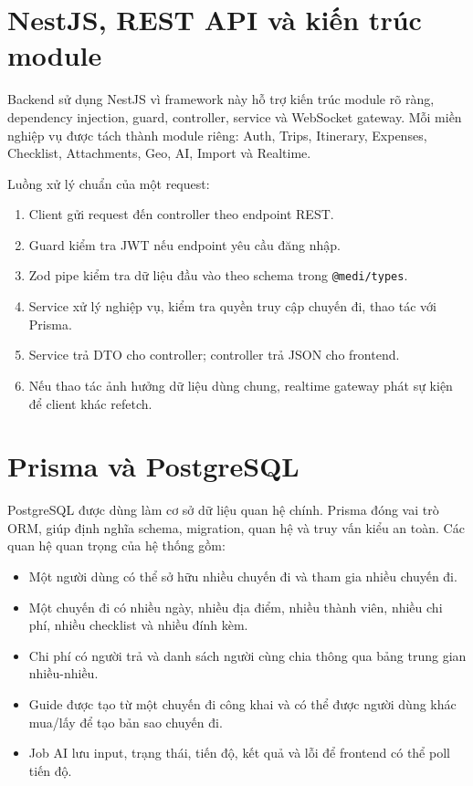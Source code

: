 \documentclass[a4paper]{report}
\begin{document}
\section{NestJS, REST API và kiến trúc module}

Backend sử dụng NestJS vì framework này hỗ trợ kiến trúc module rõ ràng, dependency injection, guard, controller, service và WebSocket gateway. Mỗi miền nghiệp vụ được tách thành module riêng: Auth, Trips, Itinerary, Expenses, Checklist, Attachments, Geo, AI, Import và Realtime.

Luồng xử lý chuẩn của một request:

\begin{enumerate}
  \item Client gửi request đến controller theo endpoint REST.
  \item Guard kiểm tra JWT nếu endpoint yêu cầu đăng nhập.
  \item Zod pipe kiểm tra dữ liệu đầu vào theo schema trong \texttt{@medi/types}.
  \item Service xử lý nghiệp vụ, kiểm tra quyền truy cập chuyến đi, thao tác với Prisma.
  \item Service trả DTO cho controller; controller trả JSON cho frontend.
  \item Nếu thao tác ảnh hưởng dữ liệu dùng chung, realtime gateway phát sự kiện để client khác refetch.
\end{enumerate}

\section{Prisma và PostgreSQL}

PostgreSQL được dùng làm cơ sở dữ liệu quan hệ chính. Prisma đóng vai trò ORM, giúp định nghĩa schema, migration, quan hệ và truy vấn kiểu an toàn. Các quan hệ quan trọng của hệ thống gồm:

\begin{itemize}
  \item Một người dùng có thể sở hữu nhiều chuyến đi và tham gia nhiều chuyến đi.
  \item Một chuyến đi có nhiều ngày, nhiều địa điểm, nhiều thành viên, nhiều chi phí, nhiều checklist và nhiều đính kèm.
  \item Chi phí có người trả và danh sách người cùng chia thông qua bảng trung gian nhiều-nhiều.
  \item Guide được tạo từ một chuyến đi công khai và có thể được người dùng khác mua/lấy để tạo bản sao chuyến đi.
  \item Job AI lưu input, trạng thái, tiến độ, kết quả và lỗi để frontend có thể poll tiến độ.
\end{itemize}
\end{document}

